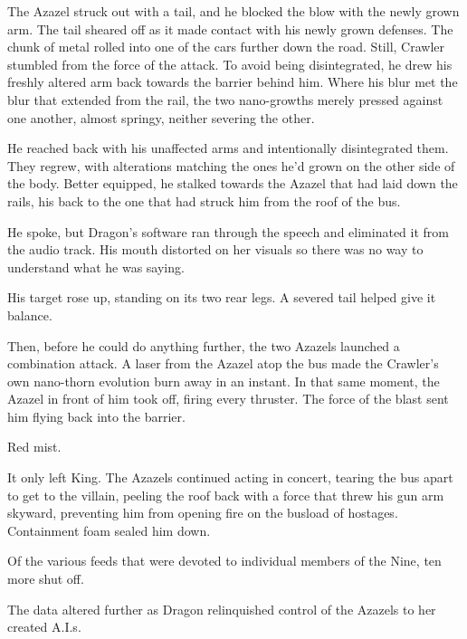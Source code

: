 The Azazel struck out with a tail, and he blocked the blow with the newly grown arm.  The tail sheared off as it made contact with his newly grown defenses.  The chunk of metal rolled into one of the cars further down the road.  Still, Crawler stumbled from the force of the attack.  To avoid being disintegrated, he drew his freshly altered arm back towards the barrier behind him.  Where his blur met the blur that extended from the rail, the two nano-growths merely pressed against one another, almost springy, neither severing the other.



He reached back with his unaffected arms and intentionally disintegrated them.  They regrew, with alterations matching the ones he'd grown on the other side of the body.  Better equipped, he stalked towards the Azazel that had laid down the rails, his back to the one that had struck him from the roof of the bus.



He spoke, but Dragon's software ran through the speech and eliminated it from the audio track.  His mouth distorted on her visuals so there was no way to understand what he was saying.



His target rose up, standing on its two rear legs.  A severed tail helped give it balance.



Then, before he could do anything further, the two Azazels launched a combination attack.  A laser from the Azazel atop the bus made the Crawler's own nano-thorn evolution burn away in an instant.  In that same moment, the Azazel in front of him took off, firing every thruster.  The force of the blast sent him flying back into the barrier.



Red mist.



It only left King.  The Azazels continued acting in concert, tearing the bus apart to get to the villain, peeling the roof back with a force that threw his gun arm skyward, preventing him from opening fire on the busload of hostages.  Containment foam sealed him down.



Of the various feeds that were devoted to individual members of the Nine, ten more shut off.



The data altered further as Dragon relinquished control of the Azazels to her created A.I.s.




